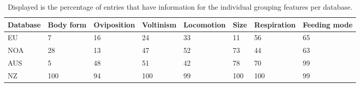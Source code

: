 \documentclass[../Draft_harmonization_paper.tex]{subfiles}
\begin{document}
\begin{table}[ht]
    \centering
    \caption{Displayed is the percentage of entries that have information for the individual grouping features per database.} 
    \label{tab:trait_coverage}
    \begin{tabular}{llllllll}
    \\
    Database & Body form & Oviposition & Voltinism & Locomotion & Size & Respiration & Feeding mode \\ 
    \toprule[.1em]
    EU & 7 & 16 & 24 & 33 & 11 & 56 & 65 \\ 
    NOA & 28 & 13 & 47 & 52 & 73 & 44 & 63 \\ 
    AUS & 5 & 48 & 51 & 42 & 78 & 70 & 99 \\ 
    NZ & 100 & 94 & 100 & 99 & 100 & 100 & 99 \\ 
    \bottomrule
    \end{tabular}
    \end{table}
\end{document}
